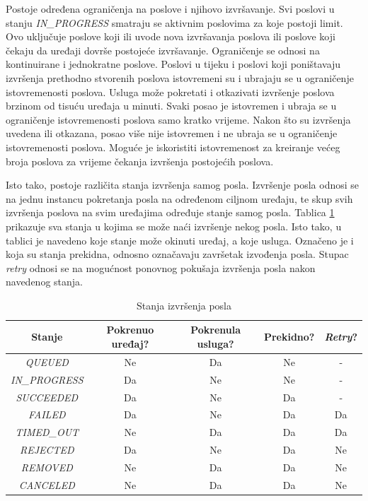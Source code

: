 Postoje određena ograničenja na poslove i njihovo izvršavanje. Svi poslovi u stanju \textit{IN\_PROGRESS} smatraju se aktivnim poslovima za koje postoji limit. Ovo uključuje poslove koji ili uvode nova izvršavanja poslova ili poslove koji čekaju da uređaji dovrše postojeće izvršavanje. Ograničenje se odnosi na kontinuirane i jednokratne poslove. Poslovi u tijeku i poslovi koji poništavaju izvršenja prethodno stvorenih poslova istovremeni su i ubrajaju se u ograničenje istovremenosti poslova. Usluga može pokretati i otkazivati izvršenje poslova brzinom od tisuću uređaja u minuti. Svaki posao je istovremen i ubraja se u ograničenje istovremenosti poslova samo kratko vrijeme. Nakon što su izvršenja uvedena ili otkazana, posao više nije istovremen i ne ubraja se u ograničenje istovremenosti poslova. Moguće je iskoristiti istovremenost za kreiranje većeg broja poslova za vrijeme čekanja izvršenja postojećih poslova.

Isto tako, postoje različita stanja izvršenja samog posla. Izvršenje posla odnosi se na jednu instancu pokretanja posla na određenom ciljnom uređaju, te skup svih izvršenja poslova na svim uređajima određuje stanje samog posla. Tablica \ref{table:job_exec_states} prikazuje sva stanja u kojima se može naći izvršenje nekog posla. Isto tako, u tablici je navedeno koje stanje može okinuti uređaj, a koje usluga. Označeno je i koja su stanja prekidna, odnosno označavaju završetak izvođenja posla. Stupac \textit{retry} odnosi se na mogućnost ponovnog pokušaja izvršenja posla nakon navedenog stanja. 

\begin{table}[ht!]
	\centering
	\small
	\caption{Stanja izvršenja posla \cite{aws_docs}}
	\begin{tabular}{|c| c| c| c| c|}
		\hline
		\rowcolor{lightblue}  
		\textbf{Stanje} & \textbf{Pokrenuo uređaj?} & \textbf{Pokrenula usluga?} & \textbf{Prekidno?} & \textbf{\textit{Retry}?} \\ \hline
		\textit{QUEUED} & Ne & Da & Ne & - \\ \hline
		\textit{IN\_PROGRESS} & Da & Ne & Ne & - \\ \hline
		\textit{SUCCEEDED} & Da & Ne & Da & - \\ \hline
		\textit{FAILED} & Da & Ne & Da & Da \\ \hline
		\textit{TIMED\_OUT} & Ne & Da & Da & Da \\ \hline
		\textit{REJECTED} & Da & Ne & Da & Ne \\ \hline
		\textit{REMOVED} & Ne & Da & Da & Ne \\ \hline
		\textit{CANCELED} & Ne & Da & Da & Ne \\ \hline
	\end{tabular}
	\label{table:job_exec_states}
\end{table}

